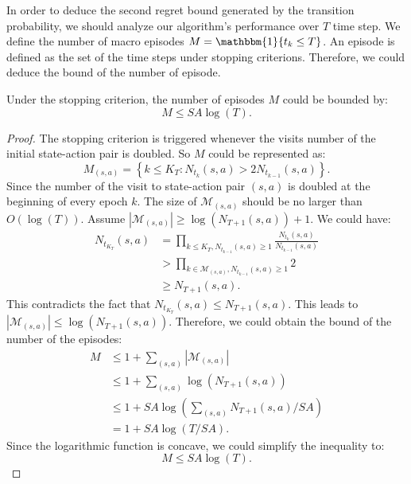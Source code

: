 In order to deduce the second regret bound generated by the transition probability, we should analyze our algorithm's performance over $T$ time step. We define the number of macro episodes $M = \mathbbm{1}\{t_{k} \leq T\}$. An episode is defined as the set of the time steps under stopping criterions. Therefore, we could deduce the bound of the number of episode.
\begin{lemma}
\label{lemma1.1}
Under the stopping criterion, the number of episodes $M$ could be bounded by:
$$
M \leq S A \log (T).
$$\cite{NIPS2017_36e729ec}
\begin{proof}
The stopping criterion is triggered whenever the visits number of the initial state-action pair is doubled. So $M$ could be represented as:
\begin{equation}
M_{(s, a)}=\left\{k \leq K_{T}: N_{t_{k}}(s, a)>2 N_{t_{k-1}}(s, a)\right\}.
\end{equation}
Since the number of the visit to state-action pair $(s,a)$ is doubled at the beginning of every epoch $k$. The size of $\mathcal{M}_{(s, a)}$ should be no larger than $O(\log (T))$. Assume $\left|\mathcal{M}_{(s, a)}\right| \geq \log \left(N_{T+1}(s, a)\right)+1$. We could have:
\begin{equation}
\begin{aligned}
N_{t_{K_{T}}}(s, a) &= \prod_{k \leq K_{T}, N_{t_{k-1}}(s, a) \geq 1} \frac{N_{t_{k}}(s, a)}{N_{t_{k-1}}(s, a)}\\
&> \prod_{k \in \mathcal{M}_{(s, a)}, N_{t_{k-1}}(s, a) \geq 1} 2 \\
&\geq N_{T+1}(s, a).
\end{aligned}
\end{equation}
This contradicts the fact that $N_{t_{K_{T}}}(s, a) \leq N_{T+1}(s, a)$. This leads to $\left|\mathcal{M}_{(s, a)}\right| \leq \log \left(N_{T+1}(s, a)\right)$. Therefore, we could obtain the bound of the number of the episodes:
\begin{equation}
\begin{aligned}
M & \leq 1+\sum_{(s, a)}\left|\mathcal{M}_{(s, a)}\right|\\
&\leq 1+\sum_{(s, a)} \log \left(N_{T+1}(s, a)\right) \\
& \leq 1+S A \log \left(\sum_{(s, a)} N_{T+1}(s, a) / S A\right)\\
&=1+S A \log (T / S A).
\end{aligned}
\end{equation}
Since the logarithmic function is concave, we could simplify the inequality to:
\begin{equation}
M \leq S A \log(T).
\end{equation}
\end{proof}
\end{lemma}

